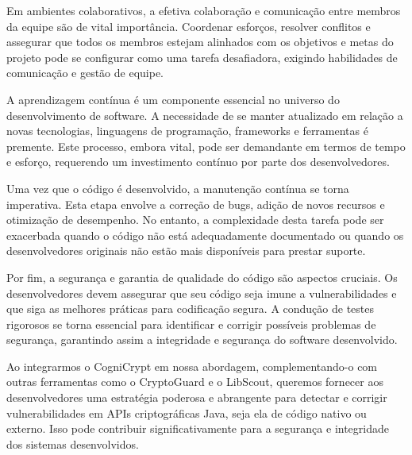Em ambientes colaborativos, a efetiva colaboração e comunicação entre membros da equipe são de vital importância. Coordenar esforços, resolver conflitos e assegurar que todos os membros estejam alinhados com os objetivos e metas do projeto pode se configurar como uma tarefa desafiadora, exigindo habilidades de comunicação e gestão de equipe.

A aprendizagem contínua é um componente essencial no universo do desenvolvimento de software. A necessidade de se manter atualizado em relação a novas tecnologias, linguagens de programação, frameworks e ferramentas é premente. Este processo, embora vital, pode ser demandante em termos de tempo e esforço, requerendo um investimento contínuo por parte dos desenvolvedores.

Uma vez que o código é desenvolvido, a manutenção contínua se torna imperativa. Esta etapa envolve a correção de bugs, adição de novos recursos e otimização de desempenho. No entanto, a complexidade desta tarefa pode ser exacerbada quando o código não está adequadamente documentado ou quando os desenvolvedores originais não estão mais disponíveis para prestar suporte.

Por fim, a segurança e garantia de qualidade do código são aspectos cruciais. Os desenvolvedores devem assegurar que seu código seja imune a vulnerabilidades e que siga as melhores práticas para codificação segura. A condução de testes rigorosos se torna essencial para identificar e corrigir possíveis problemas de segurança, garantindo assim a integridade e segurança do software desenvolvido.

Ao integrarmos o CogniCrypt em nossa abordagem, complementando-o com outras ferramentas como o CryptoGuard e o LibScout, queremos fornecer aos desenvolvedores uma estratégia poderosa e abrangente para detectar e corrigir vulnerabilidades em APIs criptográficas Java, seja ela de código nativo ou externo. Isso pode contribuir significativamente para a segurança e integridade dos sistemas desenvolvidos.






